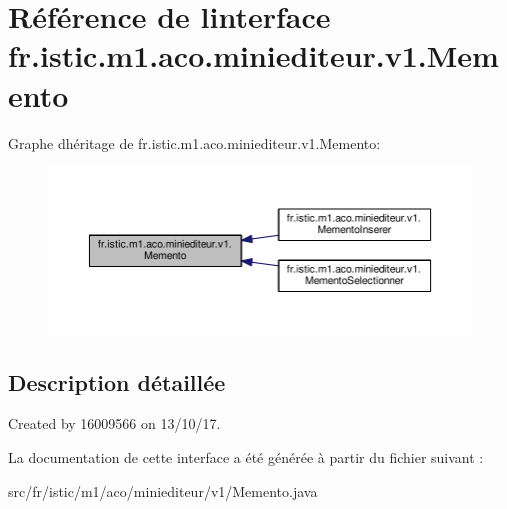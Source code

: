 \hypertarget{interfacefr_1_1istic_1_1m1_1_1aco_1_1miniediteur_1_1v1_1_1Memento}{}\section{Référence de l\textquotesingle{}interface fr.\+istic.\+m1.\+aco.\+miniediteur.\+v1.\+Memento}
\label{interfacefr_1_1istic_1_1m1_1_1aco_1_1miniediteur_1_1v1_1_1Memento}


Graphe d\textquotesingle{}héritage de fr.\+istic.\+m1.\+aco.\+miniediteur.\+v1.\+Memento\+:
\nopagebreak
\begin{figure}[H]
\begin{center}
\leavevmode
\includegraphics[width=350pt]{interfacefr_1_1istic_1_1m1_1_1aco_1_1miniediteur_1_1v1_1_1Memento__inherit__graph}
\end{center}
\end{figure}


\subsection{Description détaillée}
Created by 16009566 on 13/10/17. 

La documentation de cette interface a été générée à partir du fichier suivant \+:\begin{DoxyCompactItemize}
\item 
src/fr/istic/m1/aco/miniediteur/v1/Memento.\+java\end{DoxyCompactItemize}
